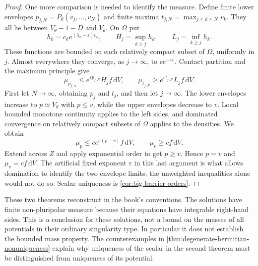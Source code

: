 \begin{proof}
One more comparison is needed to identify the measure. Define finite lower envelopes $p_{j,N}=P_\theta(v_j,\ldots,v_N)$ and finite maxima $t_{j,N}=\max_{j\leq k\leq N}v_k$. They all lie between $V_\theta-1-D$ and $V_\theta$. On $\Omega$ put
\[
 h_k=c_k e^{(\lambda_k-\varepsilon)v_k},\qquad
 H_j=\sup_{k\geq j}h_k,\qquad L_j=\inf_{k\geq j}h_k.
\]
These functions are bounded on each relatively compact subset of $\Omega$, uniformly in $j$. Almost everywhere they converge, as $j\to\infty$, to $c e^{-\varepsilon v}$. Contact partition and the maximum principle give
\[
 \mu_{p_{j,N}}\leq e^{\varepsilon p_{j,N}}H_jf\,\mathrm{d}V,
 \qquad
 \mu_{t_{j,N}}\geq e^{\varepsilon t_{j,N}}L_jf\,\mathrm{d}V.
\]
First let $N\to\infty$, obtaining $p_j$ and $t_j$, and then let $j\to\infty$. The lower envelopes increase to $p\simeq V_\theta$ with $p\leq v$, while the upper envelopes decrease to $v$. Local bounded monotone continuity applies to the left sides, and dominated convergence on relatively compact subsets of $\Omega$ applies to the densities. We obtain
\[
 \mu_p\leq c e^{\varepsilon(p-v)}f\,\mathrm{d}V,
 \qquad \mu_v\geq cf\,\mathrm{d}V.
\]
Extend across $Z$ and apply exponential order to get $p\geq v$. Hence $p=v$ and $\mu_v=cf\,\mathrm{d}V$. The artificial fixed exponent $\varepsilon$ in this last argument is what allows domination to identify the two envelope limits; the unweighted inequalities alone would not do so. Scalar uniqueness is \cref{cor:big-barrier-orders}.
\end{proof}

These two theorems reconstruct \cite[Theorems 4.6--4.7]{BGL25} in the book's conventions. The solutions have finite non-pluripolar measure because their equations have integrable right-hand sides. This is a conclusion for these solutions, not a bound on the masses of all potentials in their ordinary singularity type. In particular it does not establish the bounded mass property. The counterexamples in \cref{thm:degenerate-hermitian-nonuniqueness} explain why uniqueness of the scalar in the second theorem must be distinguished from uniqueness of its potential.
